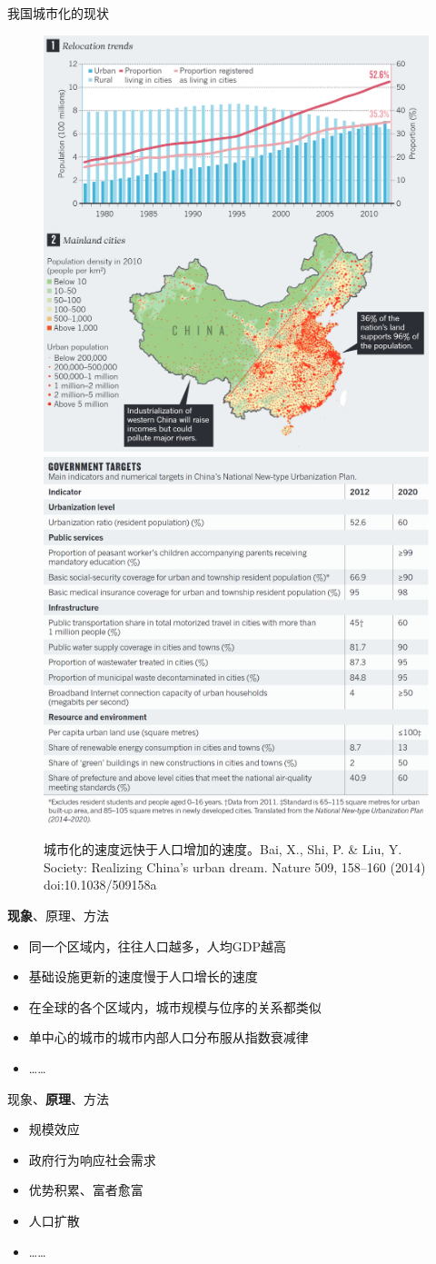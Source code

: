 \documentclass[utf8]{ctexbeamer}
\begin{document}
\begin{frame}{我国城市化的现状}

\begin{figure}
    \centering
    \includegraphics[width = 0.42\linewidth]{./图片/urban.png}
    \includegraphics[width = 0.48\linewidth]{./图片/indicators.png}
    \caption{城市化的速度远快于人口增加的速度。Bai, X., Shi, P. \& Liu, Y. Society: Realizing China's urban dream. Nature 509, 158–160 (2014) doi:10.1038/509158a}
\end{figure}
\end{frame}

\begin{frame}{\textbf{现象}、原理、方法}
    \begin{itemize}
        \item 同一个区域内，往往人口越多，人均GDP越高
        \item 基础设施更新的速度慢于人口增长的速度
        \item 在全球的各个区域内，城市规模与位序的关系都类似
        \item 单中心的城市的城市内部人口分布服从指数衰减律
        \item ……
    \end{itemize}
\end{frame}

\begin{frame}{现象、\textbf{原理}、方法}
    \begin{itemize}
        \item 规模效应
        \item 政府行为响应社会需求
        \item 优势积累、富者愈富
        \item 人口扩散
        \item ……
    \end{itemize}
\end{frame}
\end{document}
